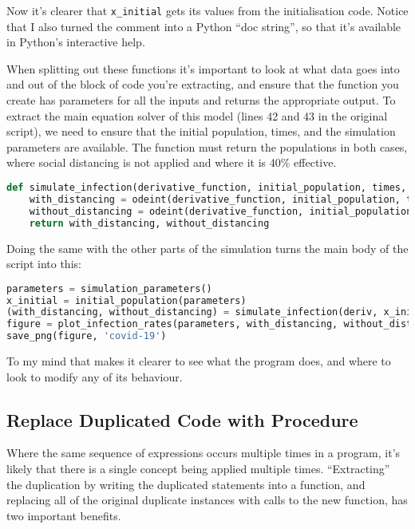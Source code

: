 \documentclass[a4paper]{article}
\begin{document}
Now it's clearer that \texttt{x\_initial} gets its values from the initialisation code. Notice that I also turned the comment into a Python ``doc string'', so that it's available in Python's interactive help.

When splitting out these functions it's important to look at what data goes into and out of the block of code you're extracting, and ensure that the function you create has parameters for all the inputs and returns the appropriate output. To extract the main equation solver of this model (lines 42 and 43 in the original script), we need to ensure that the initial population, times, and the simulation parameters are available. The function must return the populations in both cases, where social distancing is not applied and where it is 40\% effective.

\begin{lstlisting}[language=Python]
def simulate_infection(derivative_function, initial_population, times, social_distance_effectivess, alpha, beta, gamma):
    with_distancing = odeint(derivative_function, initial_population, times, args=(social_distance_effectivess, alpha, beta, gamma)).T
    without_distancing = odeint(derivative_function, initial_population, times, args=(0, alpha, beta, gamma)).T
    return with_distancing, without_distancing
\end{lstlisting}

Doing the same with the other parts of the simulation turns the main body of the script into this:

\begin{lstlisting}[language=Python]
parameters = simulation_parameters()
x_initial = initial_population(parameters)
(with_distancing, without_distancing) = simulate_infection(deriv, x_initial, parameters)
figure = plot_infection_rates(parameters, with_distancing, without_distancing)
save_png(figure, 'covid-19')
\end{lstlisting}

To my mind that makes it clearer to see what the program does, and where to look to modify any of its behaviour.

\subsection{Replace Duplicated Code with Procedure}

Where the same sequence of expressions occurs multiple times in a program, it's likely that there is a single concept being applied multiple times. ``Extracting'' the duplication by writing the duplicated statements into a function, and replacing all of the original duplicate instances with calls to the new function, has two important benefits.
\end{document}
